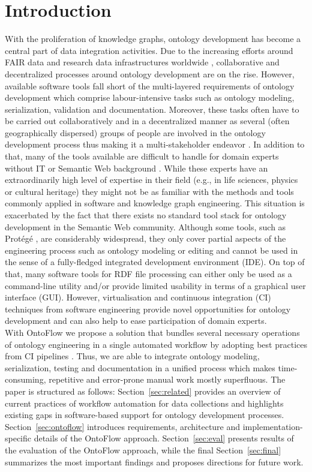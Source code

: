 \documentclass[runningheads]{llncs}
\begin{document}
\section{Introduction}
With the proliferation of knowledge graphs, ontology development has become a central part of data integration activities. Due to the increasing efforts around FAIR data and research data infrastructures worldwide \cite{fair}, collaborative and decentralized processes around ontology development are on the rise. However, available software tools fall short of the multi-layered requirements of ontology development which comprise labour-intensive tasks such as ontology modeling, serialization, validation and documentation. Moreover, these tasks often have to be carried out collaboratively and in a decentralized manner as several (often geographically dispersed) groups of people are involved in the ontology development process thus making it a multi-stakeholder endeavor \cite{sure}. In addition to that, many of the tools available are difficult to handle for domain experts without IT or Semantic Web background \cite{tudorache}. While these experts have an extraordinarily high level of expertise in their field (e.g., in life sciences, physics or cultural heritage) they might not be as familiar with the methods and tools commonly applied in software and knowledge graph engineering. This situation is exacerbated by the fact that there exists no standard tool stack for ontology development in the Semantic Web community. Although some tools, such as Protégé \cite{protege}, are considerably widespread, they only cover partial aspects of the engineering process such as ontology modeling or editing and cannot be used in the sense of a fully-fledged integrated development environment (IDE). On top of that, many software tools for RDF file processing can either only be used as a command-line utility and/or provide limited usability in terms of a graphical user interface (GUI). However, virtualisation and continuous integration (CI) techniques from software engineering provide novel opportunities for ontology development \cite{fowler} and can also help to ease participation of domain experts.\\
With OntoFlow we propose a solution that bundles several necessary operations of ontology engineering in a single automated workflow by adopting best practices from CI pipelines \cite{humble}. Thus, we are able to integrate ontology modeling, serialization, testing and documentation in a unified process which makes time-consuming, repetitive and error-prone manual work mostly superfluous.
The paper is structured as follows: Section~\ref{sec:related} provides an overview of current practices of workflow automation for data collections and highlights existing gaps in software-based support for ontology development processes. Section~\ref{sec:ontoflow} introduces requirements, architecture and implementation-specific details of the OntoFlow approach. Section~\ref{sec:eval} presents results of the evaluation of the OntoFlow approach, while the final Section~\ref{sec:final} summarizes the most important findings and proposes directions for future work.
\end{document}
